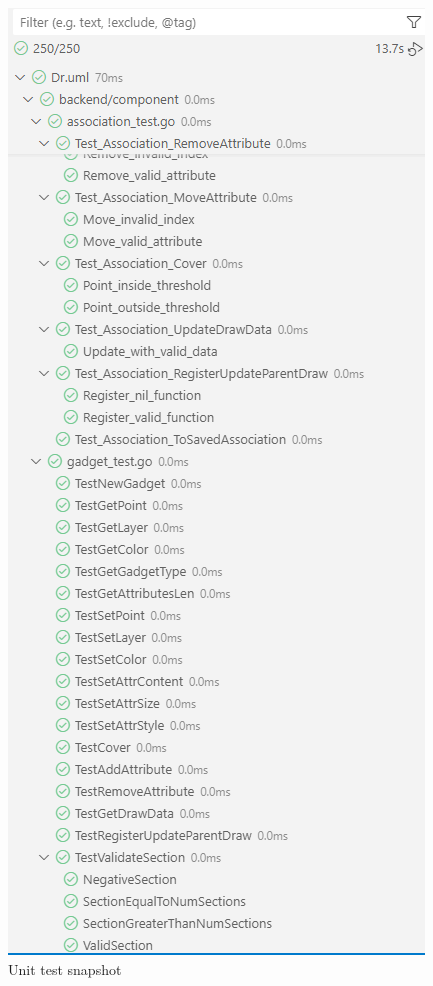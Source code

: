\documentclass[12pt]{article}
\begin{document}
    \begin{figure}[H]
        \begin{center}
            \includegraphics[width=0.95\linewidth]
            {assets/hw7/cover2.png}
            \caption{Unit test snapshot}
        \end{center}
    \end{figure}
\end{document}
